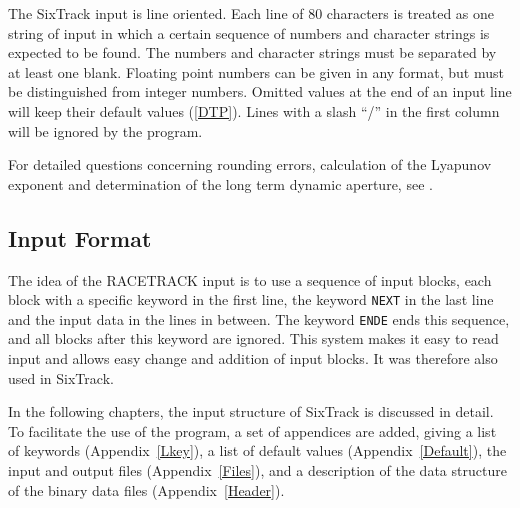 The SixTrack input is line oriented.
Each line of 80 characters is treated as one string of input in which a certain sequence of numbers and character strings is expected to be found.
The numbers and character strings must be separated by at least one blank.
Floating point numbers can be given in any format, but must be distinguished from integer numbers.
Omitted values at the end of an input line will keep their default values (\ref{DTP}).
Lines with a slash ``/'' in the first column will be ignored by the program.

For detailed questions concerning rounding errors, calculation of the Lyapunov exponent and determination of the long term dynamic aperture, see \cite{thesis}.

\subsection{Input Format} \label{sec:informat}

The idea of the RACETRACK input is to use a sequence of input blocks, each block with a specific keyword in the first line, the keyword \texttt{NEXT} in the last line and the input data in the lines in between.
The keyword \texttt{ENDE} ends this sequence, and all blocks after this keyword are ignored.
This system makes it easy to read input and allows easy change and addition of input blocks. It was therefore also used in SixTrack\@.

In the following chapters, the input structure of SixTrack is discussed in detail.
To facilitate the use of the program, a set of appendices are added, giving a list of keywords \mbox{(Appendix~\ref{Lkey}),} a list of default values \mbox{(Appendix~\ref{Default}),} the input and output files \mbox{(Appendix~\ref{Files}),} and a description of the data structure of the binary data files \mbox{(Appendix~\ref{Header}).}
